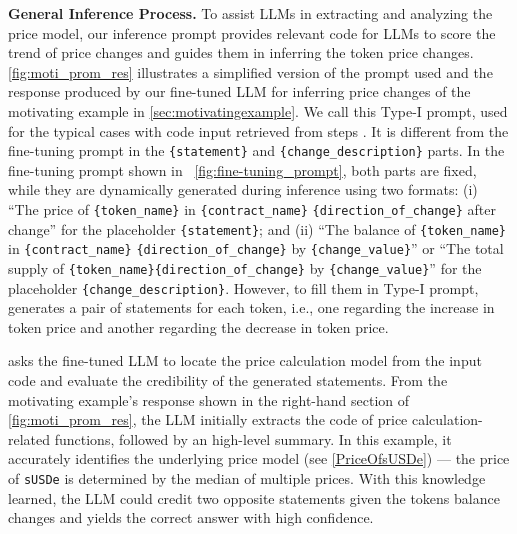 \noindent
\textbf{General Inference Process.}
To assist LLMs in extracting and analyzing the price model, our inference prompt provides relevant code for LLMs to score the trend of price changes and guides them in inferring the token price changes.
\myfig\ref{fig:moti_prom_res} illustrates a simplified version of the prompt used and the response produced by our fine-tuned LLM for inferring price changes of the motivating example in \mysec\ref{sec:motivatingexample}.
We call this Type-I prompt, used for the typical cases with code input retrieved from steps .
It is different from the fine-tuning prompt in the \texttt{\{statement\}} and \texttt{\{change\_description\}} parts.
In the fine-tuning prompt shown in \myfig~\ref{fig:fine-tuning_prompt}, both parts are fixed, while they are dynamically generated during inference using two formats:
(i) ``The price of \texttt{\{token\_name\}} in \texttt{\{contract\_name\}} \texttt{\{direction\_of\_change\}} after change'' for the placeholder \texttt{\{statement\}};
and (ii) ``The balance of \texttt{\{token\_name\}} in \texttt{\{contract\_name\}} \texttt{\{direction\_of\_change\}} by \texttt{\{change\_value\}}'' or ``The total supply of \texttt{\{token\_name\}\{direction\_of\_change\}} by \texttt{\{change\_value\}}'' for the placeholder \texttt{\{change\_description\}}.
However, to fill them in Type-I prompt, \name generates a pair of statements for each token, i.e., one regarding the increase in token price and another regarding the decrease in token price.

\name asks the fine-tuned LLM to locate the price calculation model from the input code and evaluate the credibility of the generated statements.
From the motivating example's response shown in the right-hand section of \myfig\ref{fig:moti_prom_res}, the LLM initially extracts the code of price calculation-related functions, followed by an high-level summary.
In this example, it accurately identifies the underlying price model (see \cref{PriceOfsUSDe}) --- the price of \texttt{sUSDe} is determined by the median of multiple prices.
With this knowledge learned, the LLM could credit two opposite statements given the tokens balance changes and yields the correct answer with high confidence.

